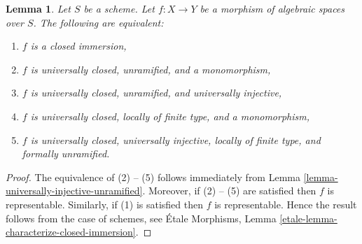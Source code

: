 \documentclass[10pt,a4paper]{amsart}
\theoremstyle{plain}
\newtheorem{lemma}[subsection]{Lemma}
\theoremstyle{definition}
\theoremstyle{remark}
\numberwithin{equation}{subsection}
\begin{document}
\begin{lemma}
\label{lemma-characterize-closed-immersion}
Let $S$ be a scheme.
Let $f : X \to Y$ be a morphism of algebraic spaces over $S$.
The following are equivalent:
\begin{enumerate}
\item $f$ is a closed immersion,
\item $f$ is universally closed, unramified, and a monomorphism,
\item $f$ is universally closed, unramified, and universally injective,
\item $f$ is universally closed, locally of finite type, and a monomorphism,
\item $f$ is universally closed, universally injective, locally of
finite type, and formally unramified.
\end{enumerate}
\end{lemma}

\begin{proof}
The equivalence of (2) -- (5) follows immediately from
Lemma \ref{lemma-universally-injective-unramified}.
Moreover, if (2) -- (5) are satisfied then $f$ is representable.
Similarly, if (1) is satisfied then $f$ is representable.
Hence the result follows from the case of schemes, see
\'Etale Morphisms, Lemma \ref{etale-lemma-characterize-closed-immersion}.
\end{proof}
\end{document}
